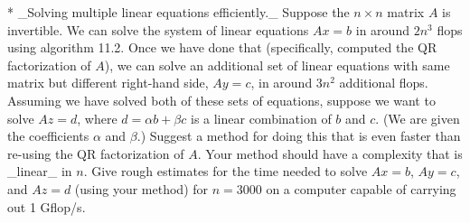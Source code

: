 * _Solving multiple linear equations efficiently._ Suppose the \(n\times n\) matrix \(A\) is invertible. We can solve the system of linear equations \(Ax=b\) in around \(2n^{3}\) flops using algorithm 11.2. Once we have done that (specifically, computed the QR factorization of \(A\)), we can solve an additional set of linear equations with same matrix but different right-hand side, \(Ay=c\), in around \(3n^{2}\) additional flops. Assuming we have solved both of these sets of equations, suppose we want to solve \(Az=d\), where \(d=\alpha b+\beta c\) is a linear combination of \(b\) and \(c\). (We are given the coefficients \(\alpha\) and \(\beta\).) Suggest a method for doing this that is even faster than re-using the QR factorization of \(A\). Your method should have a complexity that is _linear_ in \(n\). Give rough estimates for the time needed to solve \(Ax=b\), \(Ay=c\), and \(Az=d\) (using your method) for \(n=3000\) on a computer capable of carrying out 1 Gflop/s.

 